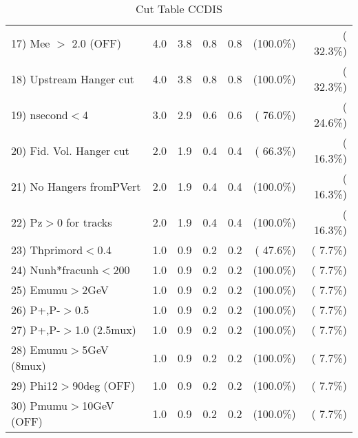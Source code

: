 \begin{table}[h!]
\begin{tabular}{||l||r|r|r|r|r|r||}
 17) Mee $>$ 2.0  (OFF)   &          4.0 &          3.8 &          0.8 &          0.8 & (100.0\%) & ( 32.3\%) \\
 18) Upstream Hanger cut  &          4.0 &          3.8 &          0.8 &          0.8 & (100.0\%) & ( 32.3\%) \\
 19) nsecond$<$4          &          3.0 &          2.9 &          0.6 &          0.6 & ( 76.0\%) & ( 24.6\%) \\
 20) Fid. Vol. Hanger cut &          2.0 &          1.9 &          0.4 &          0.4 & ( 66.3\%) & ( 16.3\%) \\
 21) No Hangers fromPVert &          2.0 &          1.9 &          0.4 &          0.4 & (100.0\%) & ( 16.3\%) \\
 22) Pz$>$0 for tracks    &          2.0 &          1.9 &          0.4 &          0.4 & (100.0\%) & ( 16.3\%) \\
 23) Thprimord$<$0.4      &          1.0 &          0.9 &          0.2 &          0.2 & ( 47.6\%) & (  7.7\%) \\
 24) Nunh*fracunh$<$200   &          1.0 &          0.9 &          0.2 &          0.2 & (100.0\%) & (  7.7\%) \\
 25) Emumu$>$2GeV         &          1.0 &          0.9 &          0.2 &          0.2 & (100.0\%) & (  7.7\%) \\
 26) P+,P-$>$0.5          &          1.0 &          0.9 &          0.2 &          0.2 & (100.0\%) & (  7.7\%) \\
 27) P+,P-$>$1.0 (2.5mux) &          1.0 &          0.9 &          0.2 &          0.2 & (100.0\%) & (  7.7\%) \\
 28) Emumu$>$5GeV  (8mux) &          1.0 &          0.9 &          0.2 &          0.2 & (100.0\%) & (  7.7\%) \\
 29) Phi12$>$90deg  (OFF) &          1.0 &          0.9 &          0.2 &          0.2 & (100.0\%) & (  7.7\%) \\
 30) Pmumu$>$10GeV  (OFF) &          1.0 &          0.9 &          0.2 &          0.2 & (100.0\%) & (  7.7\%) \\
 \hline
 \hline
 \end{tabular}
 \caption{Cut Table  CCDIS    }
 \label{tab-cutcohjpsi-mumu_ncdis}
 \end{table}
